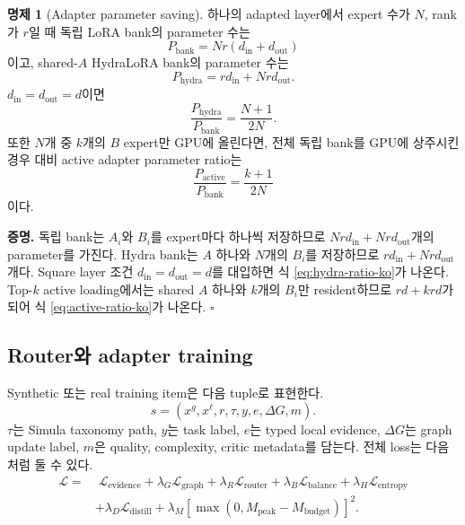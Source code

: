 \documentclass[11pt]{article}
\theoremstyle{definition}
\newtheorem{proposition}{명제}
\begin{document}
\begin{proposition}[Adapter parameter saving]
하나의 adapted layer에서 expert 수가 $N$, rank가 $r$일 때 독립 LoRA bank의 parameter 수는
\begin{equation}
  P_{\mathrm{bank}} = N r(d_{\mathrm{in}}+d_{\mathrm{out}})
\end{equation}
이고, shared-$A$ HydraLoRA bank의 parameter 수는
\begin{equation}
  P_{\mathrm{hydra}} = r d_{\mathrm{in}} + N r d_{\mathrm{out}}.
\end{equation}
$d_{\mathrm{in}}=d_{\mathrm{out}}=d$이면
\begin{equation}
  \frac{P_{\mathrm{hydra}}}{P_{\mathrm{bank}}}=\frac{N+1}{2N}.
  \label{eq:hydra-ratio-ko}
\end{equation}
또한 $N$개 중 $k$개의 $B$ expert만 GPU에 올린다면, 전체 독립 bank를 GPU에 상주시킨 경우 대비 active adapter parameter ratio는
\begin{equation}
  \frac{P_{\mathrm{active}}}{P_{\mathrm{bank}}}=\frac{k+1}{2N}
  \label{eq:active-ratio-ko}
\end{equation}
이다.
\end{proposition}

\noindent\textbf{증명.}
독립 bank는 $A_i$와 $B_i$를 expert마다 하나씩 저장하므로 $Nr d_{\mathrm{in}}+Nr d_{\mathrm{out}}$개의 parameter를 가진다.
Hydra bank는 $A$ 하나와 $N$개의 $B_i$를 저장하므로 $rd_{\mathrm{in}}+Nr d_{\mathrm{out}}$개다.
Square layer 조건 $d_{\mathrm{in}}=d_{\mathrm{out}}=d$를 대입하면 식 \ref{eq:hydra-ratio-ko}가 나온다.
Top-$k$ active loading에서는 shared $A$ 하나와 $k$개의 $B_i$만 resident하므로 $rd+krd$가 되어 식 \ref{eq:active-ratio-ko}가 나온다. \hfill$\square$

\subsection{Router와 adapter training}

Synthetic 또는 real training item은 다음 tuple로 표현한다.
\begin{equation}
  s =
  (x^g,x^\ell,r,\tau,y,e,\Delta G,m).
\end{equation}
$\tau$는 Simula taxonomy path, $y$는 task label, $e$는 typed local evidence, $\Delta G$는 graph update label, $m$은 quality, complexity, critic metadata를 담는다.
전체 loss는 다음처럼 둘 수 있다.
\begin{align}
  \mathcal{L}
  =&\;
  \mathcal{L}_{\mathrm{evidence}}
  + \lambda_G \mathcal{L}_{\mathrm{graph}}
  + \lambda_R \mathcal{L}_{\mathrm{router}}
  + \lambda_B \mathcal{L}_{\mathrm{balance}}
  + \lambda_H \mathcal{L}_{\mathrm{entropy}}
  \nonumber\\
  &+
  \lambda_D \mathcal{L}_{\mathrm{distill}}
  + \lambda_M \left[\max(0,M_{\mathrm{peak}}-M_{\mathrm{budget}})\right]^2.
  \label{eq:total-loss-ko}
\end{align}
\end{document}
